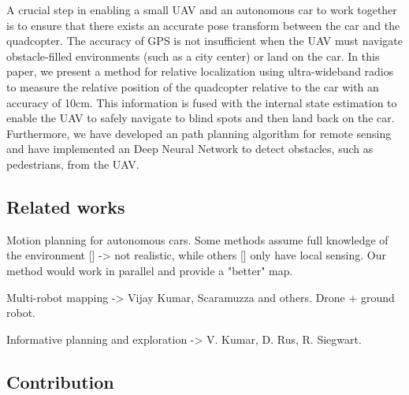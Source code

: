 
A crucial step in enabling a small UAV and an autonomous car to work
together is to ensure that there exists an accurate pose transform between the car
and the quadcopter. The accuracy of GPS is not insufficient when the UAV must navigate
obstacle-filled environments (such as a city center) or land on the car. In this 
paper, we present a method for relative localization using ultra-wideband radios to measure the relative position of the quadcopter relative to the car with an accuracy of 10cm. This information is fused with the internal state estimation to enable the UAV to safely navigate to blind spots and then land back on the car. Furthermore, we have developed an path planning algorithm for remote sensing and have implemented an Deep Neural Network to detect obstacles, such as pedestrians, from the UAV.

\subsection{Related works}

Motion planning for autonomous cars. Some methods assume full knowledge of the environment [] -> not realistic, while others [] only have local sensing. Our method would work in parallel and provide a "better" map.

Multi-robot mapping -> Vijay Kumar, Scaramuzza and others. Drone + ground robot.

Informative planning and exploration -> V. Kumar, D. Rus, R. Siegwart.

\subsection{Contribution}

